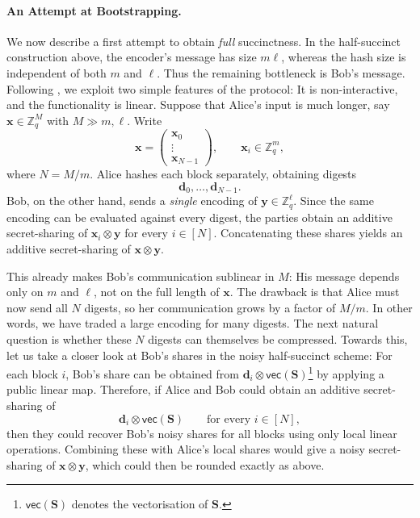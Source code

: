 \documentclass{article}
\begin{document}
{\paragraph{An Attempt at Bootstrapping.}
We now describe a first attempt to obtain \emph{full} succinctness. In the half-succinct construction above, the encoder's message has size $m\ell$, whereas the hash size is independent of both $m$ and $\ell$. Thus the remaining bottleneck is Bob's message.
Following \cite{EC:AbrRoySch24}, we exploit two simple features of the protocol: It is non-interactive, and the functionality is linear. Suppose that Alice's input is much longer, say $\mathbf{x}\in\mathbb{Z}_q^M$ with $M \gg m,\ell$. Write
\[
\mathbf{x} = \begin{pmatrix}\mathbf{x}_0\\\vdots\\\mathbf{x}_{N-1}\end{pmatrix},
\qquad
\mathbf{x}_i \in \mathbb{Z}_q^m,
\]
where $N=M/m$. Alice hashes each block separately, obtaining digests
\[
\mathbf{d}_0,\ldots,\mathbf{d}_{N-1}.
\]
Bob, on the other hand, sends a \emph{single} encoding of $\mathbf{y}\in\mathbb{Z}_q^\ell$. Since the same encoding can be evaluated against every digest, the parties obtain an additive secret-sharing of $\mathbf{x}_i\otimes \mathbf{y}$ for every $i\in[N]$. Concatenating these shares yields an additive secret-sharing of $\mathbf{x}\otimes \mathbf{y}$.}

{This already makes Bob's communication sublinear in $M$: His message depends only on $m$ and $\ell$, not on the full length of $\mathbf{x}$. The drawback is that Alice must now send all $N$ digests, so her communication grows by a factor of $M/m$. In other words, we have traded a large encoding for many digests.
The next natural question is whether these $N$ digests can themselves be compressed. Towards this, let us take a closer look at Bob's shares in the noisy half-succinct scheme: For each block $i$, Bob's share can be obtained from
$\mathbf{d}_i \otimes \mathsf{vec}(\mathbf{S})$\footnote{$\mathsf{vec}(\mathbf{S})$ denotes the vectorisation of $\mathbf{S}$.}
by applying a public linear map.
Therefore, if Alice and Bob could obtain an additive secret-sharing of
\[
\mathbf{d}_i \otimes \mathsf{vec}(\mathbf{S})
\qquad\text{for every } i\in[N],
\]
then they could recover Bob's noisy shares for all blocks using only local linear operations. Combining these with Alice's local shares would give a noisy secret-sharing of $\mathbf{x}\otimes \mathbf{y}$, which could then be rounded exactly as above.}
\end{document}
